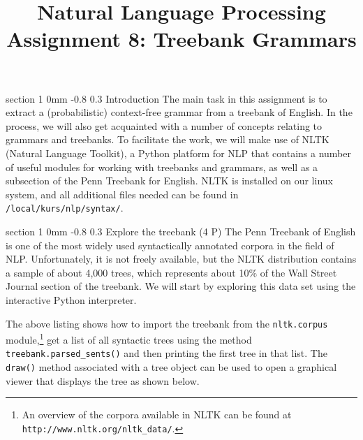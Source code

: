 \documentclass[11pt]{article}
\title{{\LARGE Natural Language Processing}\\[1.5mm]{\large Assignment 8: Treebank Grammars}}
\author{}
\date{} %
\makeatletter
\newcommand{\newsec}[2]{\section{#1}\label{sec:#2}\noindent}
\renewcommand{\section}{\@startsection
{section}%
{1}%
{0mm}%
{-0.8\baselineskip}%
{0.3\baselineskip}%
{\bfseries\large}}%
\makeatother
\begin{document}
 

\maketitle
\vspace{-2mm}
\newsec{Introduction}{intro}%
The main task in this assignment is to extract a (probabilistic) context-free grammar from a treebank of English. In the process, we will also get acquainted with a number of 
concepts relating to grammars and treebanks. To facilitate the work, we will make use of NLTK (Natural Language Toolkit), a Python platform for NLP that
contains a number of useful modules for working with treebanks and grammars, as well as a subsection of the Penn Treebank for English. NLTK is installed
on our linux system, and all additional files needed can be found in {\tt /local/kurs/nlp/syntax/}.

\newsec{Explore the treebank (4 P)}{data}%
The Penn Treebank of English is one of the most widely used syntactically annotated corpora in the field of NLP. Unfortunately, it is not freely available, but the NLTK distribution
contains a sample of about 4,000 trees, which represents about 10\% of the Wall Street Journal section of the treebank. We will start by exploring this data set using the interactive
Python interpreter.

\begin{center}
\fbox{

}
\end{center}
The above listing shows how to import the treebank from the {\tt nltk.corpus} 
module,\footnote{An overview of the corpora available in NLTK can be found at {\tt http://www.nltk.org/nltk\_data/}.} 
get a list of all syntactic trees using the method {\tt treebank.parsed\_sents()}
and then printing the first tree in that list. The {\tt draw()} method associated with 
a tree object can be used to open a graphical viewer that displays the tree as shown below.
\end{document}
